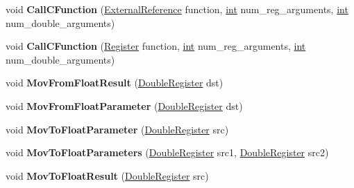 \begin{DoxyCompactItemize}
void {\bfseries Call\+C\+Function} (\mbox{\hyperlink{classv8_1_1internal_1_1ExternalReference}{External\+Reference}} function, \mbox{\hyperlink{classint}{int}} num\+\_\+reg\+\_\+arguments, \mbox{\hyperlink{classint}{int}} num\+\_\+double\+\_\+arguments)
\item 
\mbox{\label{classv8_1_1internal_1_1TurboAssembler_ac47afd32db8e770d2803e3f116c30e60}} 
void {\bfseries Call\+C\+Function} (\mbox{\hyperlink{classv8_1_1internal_1_1Register}{Register}} function, \mbox{\hyperlink{classint}{int}} num\+\_\+reg\+\_\+arguments, \mbox{\hyperlink{classint}{int}} num\+\_\+double\+\_\+arguments)
\item 
\mbox{\label{classv8_1_1internal_1_1TurboAssembler_aa610efc2002fd48b4cf5062ff040576b}} 
void {\bfseries Mov\+From\+Float\+Result} (\mbox{\hyperlink{classv8_1_1internal_1_1DoubleRegister}{Double\+Register}} dst)
\item 
\mbox{\label{classv8_1_1internal_1_1TurboAssembler_a3ef3e6f02594d358e3385eac66ceab18}} 
void {\bfseries Mov\+From\+Float\+Parameter} (\mbox{\hyperlink{classv8_1_1internal_1_1DoubleRegister}{Double\+Register}} dst)
\item 
\mbox{\label{classv8_1_1internal_1_1TurboAssembler_ac49113791072985f3f489c24bb208c35}} 
void {\bfseries Mov\+To\+Float\+Parameter} (\mbox{\hyperlink{classv8_1_1internal_1_1DoubleRegister}{Double\+Register}} src)
\item 
\mbox{\label{classv8_1_1internal_1_1TurboAssembler_afe7fc2fe9aaf078764f1eadf12fe8d79}} 
void {\bfseries Mov\+To\+Float\+Parameters} (\mbox{\hyperlink{classv8_1_1internal_1_1DoubleRegister}{Double\+Register}} src1, \mbox{\hyperlink{classv8_1_1internal_1_1DoubleRegister}{Double\+Register}} src2)
\item 
\mbox{\label{classv8_1_1internal_1_1TurboAssembler_a0a80563e5b6000c3b0b135eea184ed52}} 
void {\bfseries Mov\+To\+Float\+Result} (\mbox{\hyperlink{classv8_1_1internal_1_1DoubleRegister}{Double\+Register}} src)
\item 
\mbox{\label{classv8_1_1internal_1_1TurboAssembler_a9312d460e753c6771e4f5840b40e49b1}} 

\end{DoxyCompactItemize}

